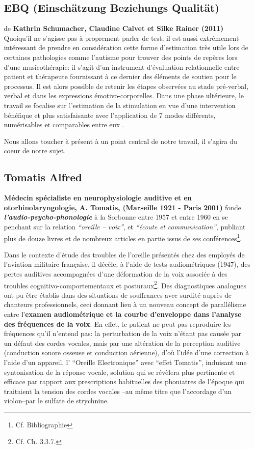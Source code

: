 \subsection{EBQ (Einschätzung Beziehungs Qualität)}
de \textbf{Kathrin Schumacher, Claudine Calvet et Silke Rainer (2011)}
Quoiqu'il ne s'agisse pas à proprement parler de test, il est aussi
extrêmement intéressant de prendre en  considération cette forme
d'estimation très
utile lors de certaines pathologies comme l'autisme pour trouver des
points de repères lors d'une musicothérapie: il s'agit d'un instrument d'évaluation relationnelle entre patient et
thérapeute fournissant à ce dernier des éléments de soutien pour le
processus.
Il est alors possible de retenir les étapes
observées au stade pré-verbal, verbal et dans les expressions
émotivo-corporelles.
Dans une phase ultérieure, le travail se focalise sur l'estimation de
la stimulation en vue d'une intervention bénéfique et plus
satisfaisante avec l'application de 7 modes différents, numérisables
et comparables entre eux \autocite{EBQ-key}.

Nous allons toucher à présent à un point central de notre travail, il
s'agira du coeur de notre sujet.

\subsection{Tomatis Alfred}

\textbf{Médecin spécialiste en neurophysiologie auditive et en
oto\-rhino\-la\-ryn\-go\-lo\-gie, A. Tomatis, (Marseille 1921 - Paris 2001) } fonde
\textit{\textbf{l'audio-psycho-phonologie }} à la Sorbonne entre
1957 et entre 1960 en  se penchant sur la relation
\textit{``oreille -- voix''}, et  \textit{``écoute
et communication''}, publiant plus de douze livres et de nombreux
articles en partie issus de ses
conférences\footnote{Cf. Bibliographie}.


Dans le contexte d'étude des troubles de
l'oreille présentés chez des employés de l'aviation militaire
française, il décèle, à l'aide
de tests audiométriques
 (1947), des pertes auditives accompagnées d'une
déformation de la voix associée à des troubles
cognitivo-comportementaux et posturaux\footnote{Cf. Ch. 3.3.7.}.
Des diagnostiques analogues ont pu être établis dans des situations
de souffrances avec surdité auprès de chanteurs professionnels,
ceci donnant lieu
à un nouveau concept de
parallélisme entre l'\textbf{examen audiométrique et la courbe
d'enveloppe dans l'analyse des fréquences de la voix}.
En effet, le patient ne peut pas reproduire les fréquences qu'il
n'entend pas:
la perturbation de la voix n'étant pas causée par un défaut des cordes
vocales, mais par une altération de la perception auditive (conduction
sonore osseuse et conduction aérienne), d'où
l'idée d'une correction à l'aide d'un appareil, l' ``Oreille
Electronique'' avec ``effet Tomatis'', induisant
une syntonisation de la réponse vocale, solution qui se révèlera plus pertinente et efficace par rapport aux prescriptions habituelles des phoniatres de
l'époque qui traitaient la tension des cordes vocales --au même titre que
l'accordage d'un violon--par le sulfate de
strychnine.

